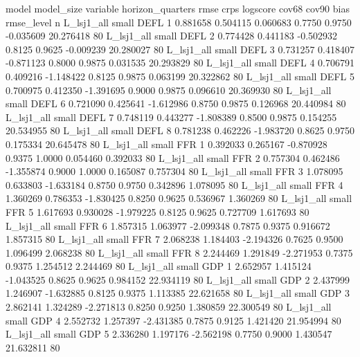          model model_size variable  horizon_quarters     rmse     crps  logscore  cov68  cov90      bias  rmse_level  n
    L_lsj1_all      small     DEFL                 1 0.881658 0.504115  0.060683 0.7750 0.9750 -0.035609   20.276418 80
    L_lsj1_all      small     DEFL                 2 0.774428 0.441183 -0.502932 0.8125 0.9625 -0.009239   20.280027 80
    L_lsj1_all      small     DEFL                 3 0.731257 0.418407 -0.871123 0.8000 0.9875  0.031535   20.293829 80
    L_lsj1_all      small     DEFL                 4 0.706791 0.409216 -1.148422 0.8125 0.9875  0.063199   20.322862 80
    L_lsj1_all      small     DEFL                 5 0.700975 0.412350 -1.391695 0.9000 0.9875  0.096610   20.369930 80
    L_lsj1_all      small     DEFL                 6 0.721090 0.425641 -1.612986 0.8750 0.9875  0.126968   20.440984 80
    L_lsj1_all      small     DEFL                 7 0.748119 0.443277 -1.808389 0.8500 0.9875  0.154255   20.534955 80
    L_lsj1_all      small     DEFL                 8 0.781238 0.462226 -1.983720 0.8625 0.9750  0.175334   20.645478 80
    L_lsj1_all      small      FFR                 1 0.392033 0.265167 -0.870928 0.9375 1.0000  0.054460    0.392033 80
    L_lsj1_all      small      FFR                 2 0.757304 0.462486 -1.355874 0.9000 1.0000  0.165087    0.757304 80
    L_lsj1_all      small      FFR                 3 1.078095 0.633803 -1.633184 0.8750 0.9750  0.342896    1.078095 80
    L_lsj1_all      small      FFR                 4 1.360269 0.786353 -1.830425 0.8250 0.9625  0.536967    1.360269 80
    L_lsj1_all      small      FFR                 5 1.617693 0.930028 -1.979225 0.8125 0.9625  0.727709    1.617693 80
    L_lsj1_all      small      FFR                 6 1.857315 1.063977 -2.099348 0.7875 0.9375  0.916672    1.857315 80
    L_lsj1_all      small      FFR                 7 2.068238 1.184403 -2.194326 0.7625 0.9500  1.096499    2.068238 80
    L_lsj1_all      small      FFR                 8 2.244469 1.291849 -2.271953 0.7375 0.9375  1.254512    2.244469 80
    L_lsj1_all      small      GDP                 1 2.652957 1.415124 -1.043525 0.8625 0.9625  0.984152   22.934119 80
    L_lsj1_all      small      GDP                 2 2.437999 1.246907 -1.632885 0.8125 0.9375  1.113385   22.621658 80
    L_lsj1_all      small      GDP                 3 2.862141 1.324289 -2.271813 0.8250 0.9250  1.380859   22.300549 80
    L_lsj1_all      small      GDP                 4 2.552732 1.257397 -2.431385 0.7875 0.9125  1.421420   21.954994 80
    L_lsj1_all      small      GDP                 5 2.336280 1.197176 -2.562198 0.7750 0.9000  1.430547   21.632811 80
